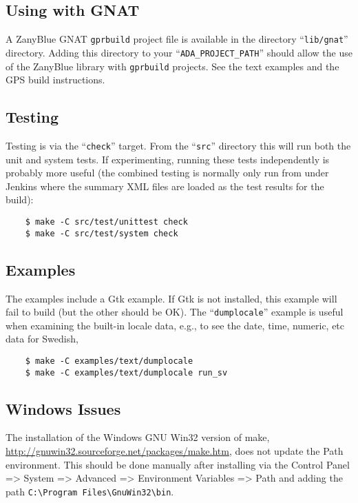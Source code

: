 \subsection{Using with GNAT}

A ZanyBlue GNAT \texttt{gprbuild} project file is available in the
directory ``\texttt{lib/gnat}'' directory.  Adding this directory to
your ``\verb|ADA_PROJECT_PATH|'' should allow the use of the ZanyBlue
library with \texttt{gprbuild} projects.  See the text examples and
the GPS build instructions.

\subsection{Testing}

Testing is via the ``\texttt{check}'' target.  From the ``\texttt{src}''
directory this will run both the unit and system tests.  If experimenting,
running these tests independently is probably more useful (the combined
testing is normally only run from under Jenkins where the summary XML files
are loaded as the test results for the build):
\begin{small}
\begin{verbatim}
    $ make -C src/test/unittest check
    $ make -C src/test/system check
\end{verbatim}
\end{small}

\subsection{Examples}

The examples include a Gtk example.  If Gtk is not installed, this example
will fail to build (but the other should be OK).  The ``\texttt{dumplocale}''
example is useful when examining the built-in locale data, e.g., to see
the date, time, numeric, etc data for Swedish,
\begin{small}
\begin{verbatim}
    $ make -C examples/text/dumplocale
    $ make -C examples/text/dumplocale run_sv
\end{verbatim}
\end{small}

\subsection{Windows Issues}

The installation of the Windows GNU Win32 version of make,
\url{http://gnuwin32.sourceforge.net/packages/make.htm}, does not update
the Path environment. This should be done manually after installing
via the Control Panel => System => Advanced => Environment Variables =>
Path and adding the path \verb|C:\Program Files\GnuWin32\bin|.

